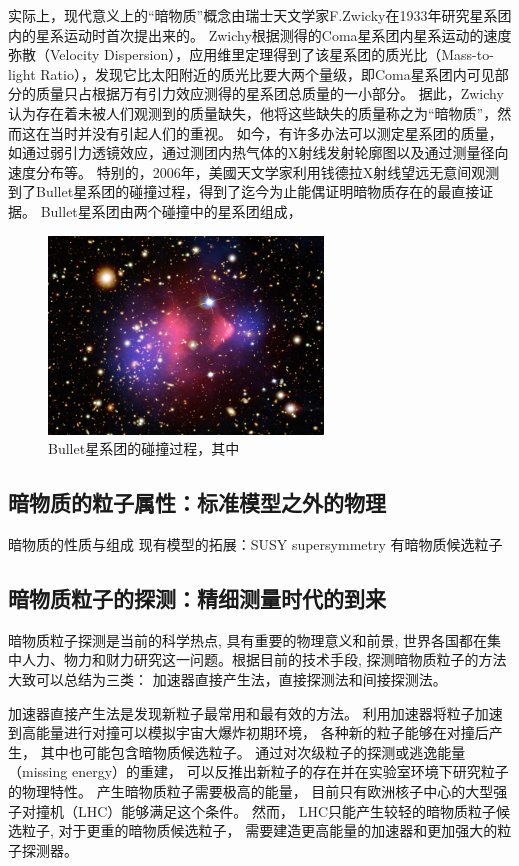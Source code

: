 实际上，现代意义上的“暗物质”概念由瑞士天文学家F.Zwicky在1933年研究星系团内的星系运动时首次提出来的\cite{zwicky1933spectral}。
Zwichy根据测得的Coma星系团内星系运动的速度弥散（Velocity Dispersion），应用维里定理得到了该星系团的质光比（Mass-to-light Ratio），发现它比太阳附近的质光比要大两个量级，即Coma星系团内可见部分的质量只占根据万有引力效应测得的星系团总质量的一小部分。
据此，Zwichy认为存在着未被人们观测到的质量缺失，他将这些缺失的质量称之为“暗物质”，然而这在当时并没有引起人们的重视。
如今，有许多办法可以测定星系团的质量，如通过弱引力透镜效应，通过测团内热气体的X射线发射轮廓图以及通过测量径向速度分布等。
特别的，2006年，美國天文学家利用钱德拉X射线望远无意间观测到了Bullet星系团的碰撞过程\cite{bullet_cluster}，得到了迄今为止能偶证明暗物质存在的最直接证据。
Bullet星系团由两个碰撞中的星系团组成，
\begin{figure}[htbp]
	\centering
	\includegraphics[width=0.65\textwidth]{chap/introduction/fig/bullet_cluster.jpg}
	\caption{Bullet星系团的碰撞过程，其中}
	\label{fig:introduction:bullet_cluster}
\end{figure}
\subsection{暗物质的粒子属性：标准模型之外的物理}
暗物质的性质与组成
现有模型的拓展：SUSY supersymmetry 有暗物质候选粒子


\subsection{暗物质粒子的探测：精细测量时代的到来}
暗物质粒子探测是当前的科学热点, 具有重要的物理意义和前景, 世界各国都在集中人力、物力和财力研究这一问题。根据目前的技术手段, 探测暗物质粒子的方法大致可以总结为三类： 加速器直接产生法，直接探测法和间接探测法。

加速器直接产生法是发现新粒子最常用和最有效的方法。
利用加速器将粒子加速到高能量进行对撞可以模拟宇宙大爆炸初期环境， 各种新的粒子能够在对撞后产生， 其中也可能包含暗物质候选粒子。
通过对次级粒子的探测或逃逸能量（missing energy）的重建， 可以反推出新粒子的存在并在实验室环境下研究粒子的物理特性。
产生暗物质粒子需要极高的能量， 目前只有欧洲核子中心的大型强子对撞机（LHC）能够满足这个条件。
然而， LHC只能产生较轻的暗物质粒子候选粒子, 对于更重的暗物质候选粒子， 需要建造更高能量的加速器和更加强大的粒子探测器。

